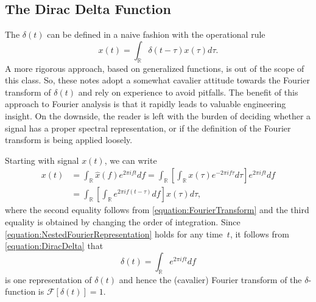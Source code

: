 \subsection{The Dirac Delta Function}

The  $\delta (t)$ can be defined in a naive fashion with the operational rule
\begin{equation} \label{equation:DiracDelta}
x(t) = \int_{\mathbb{R}} \delta (t - \tau) x(\tau) d\tau .
\end{equation}
A more rigorous approach, based on generalized functions, is out of the scope of this class.
So, these notes adopt a somewhat cavalier attitude towards the Fourier transform of $\delta(t)$ and rely on experience to avoid pitfalls.
The benefit of this approach to Fourier analysis is that it rapidly leads to valuable engineering insight.
On the downside, the reader is left with the burden of deciding whether a signal has a proper spectral representation, or if the definition of the Fourier transform is being applied loosely.

Starting with signal $x(t)$, we can write
\begin{equation} \label{equation:NestedFourierRepresentation}
\begin{split}
x(t) &= \int_{\mathbb{R}} \hat{x}(f) e^{2 \pi i f t} df
= \int_{\mathbb{R}} \left[ \int_{\mathbb{R}} x(\tau) e^{-2 \pi i f \tau} d\tau \right] e^{2 \pi i f t} df \\
&= \int_{\mathbb{R}} \left[ \int_{\mathbb{R}} e^{2 \pi i f (t - \tau)} df \right] x(\tau) d\tau ,
\end{split}
\end{equation}
where the second equality follows from \eqref{equation:FourierTransform} and the third equality is obtained by changing the order of integration.
Since \eqref{equation:NestedFourierRepresentation} holds for any time~$t$, it follows from \eqref{equation:DiracDelta} that
\begin{equation*}
\delta (t) = \int_{\mathbb{R}} e^{2 \pi i f t} df 
\end{equation*}
is one representation of $\delta(t)$ and hence the (cavalier) Fourier transform of the $\delta$-function is $\mathcal{F} [ \delta(t) ] = 1$.


